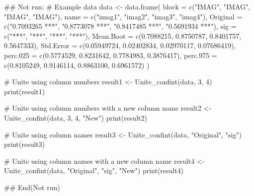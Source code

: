 \documentclass[a4paper]{book}
\begin{document}
\begin{Examples}
\begin{ExampleCode}
\#\# Not run: 
# Example data
data <- data.frame(
  block = c("IMAG", "IMAG", "IMAG", "IMAG"),
  name = c("imag1", "imag2", "imag3", "imag4"),
  Original = c("0.7093265 ***", "0.8773078 ***", "0.8417485 ***", "0.5691934 ***"),
  sig = c("***", "***", "***", "***"),
  Mean.Boot = c(0.7088215, 0.8750787, 0.8401757, 0.5647333),
  Std.Error = c(0.05949724, 0.02402834, 0.02970117, 0.07686419),
  perc.025 = c(0.5774529, 0.8231642, 0.7784983, 0.3876417),
  perc.975 = c(0.8105249, 0.9146114, 0.8863100, 0.6961572)
)

# Unite using column numbers
result1 <- Unite_confint(data, 3, 4)
print(result1)

# Unite using column numbers with a new column name
result2 <- Unite_confint(data, 3, 4, "New")
print(result2)

# Unite using column names
result3 <- Unite_confint(data, "Original", "sig")
print(result3)

# Unite using column names with a new column name
result4 <- Unite_confint(data, "Original", "sig", "New")
print(result4)

## End(Not run)
\end{ExampleCode}
\end{Examples}
\end{document}
